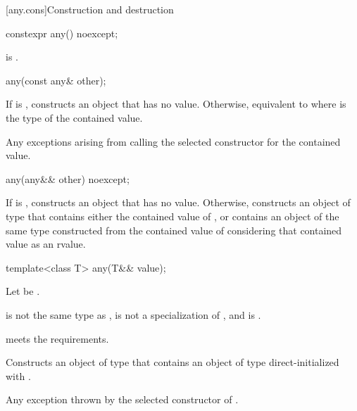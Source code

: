 [any.cons]{Construction and destruction}

%
\begin{itemdecl}
constexpr any() noexcept;
\end{itemdecl}

\begin{itemdescr}
\pnum
\ensures
{} is .
\end{itemdescr}

%
\begin{itemdecl}
any(const any& other);
\end{itemdecl}

\begin{itemdescr}
\pnum
\effects
If  is , constructs an object that has no value.
Otherwise, equivalent to 
where  is the type of the contained value.

\pnum
\throws
Any exceptions arising from calling the selected constructor for the contained value.
\end{itemdescr}

%
\begin{itemdecl}
any(any&& other) noexcept;
\end{itemdecl}

\begin{itemdescr}
\pnum
\effects
If  is , constructs an object that has no value.
Otherwise, constructs an object of type  that
contains either the contained value of , or
contains an object of the same type constructed from
the contained value of  considering that contained value as an rvalue.
\end{itemdescr}

%
\begin{itemdecl}
template<class T>
  any(T&& value);
\end{itemdecl}

\begin{itemdescr}
\pnum
Let  be .

\pnum
\constraints
{} is not the same type as ,
 is not a specialization of ,
and  is .

\pnum
\expects
{} meets the  requirements.

\pnum
\effects
Constructs an object of type  that contains an object of type  direct-initialized with .

\pnum
\throws
Any exception thrown by the selected constructor of .
\end{itemdescr}

